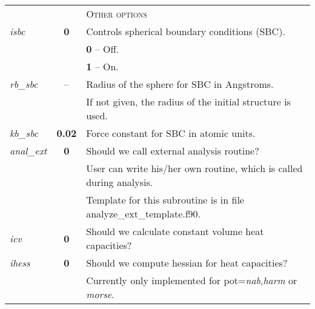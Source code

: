 \documentclass[12pt,a4paper]{article}
\begin{document}
\begin{tabular}{lcl}

& & \textsc{Other options} \\
\textit{isbc }&\textbf{0} & Controls spherical boundary conditions (SBC).\\
& & \textbf{0} -- Off.\\
& & \textbf{1} -- On.\\
\textit{rb\_sbc} & -- & Radius of the sphere for SBC in Angstroms.\\
& &  If not given, the radius of the initial structure is used. \\
\textit{kb\_sbc} & \textbf{0.02} &  Force constant for SBC in atomic units. \\

\colorbox{black!20}{\textit{anal\_ext}} & \textbf{0} & Should we call external analysis routine? \\
 & &User can write his/her own routine, which is called during analysis.\\
 & &  Template for this subroutine is in file analyze\_ext\_template.f90. \\

\colorbox{black!20}{\textit{icv}}  & \textbf{0} &	 Should we calculate constant volume heat capacities? \\
\colorbox{black!20}{\textit{ihess}}& \textbf{0} &  Should we compute hessian for heat capacities? \\
& &  Currently only implemented for pot=\textit{nab},\textit{harm} or \textit{morse}.   \\
\end{tabular} 
\end{document}
